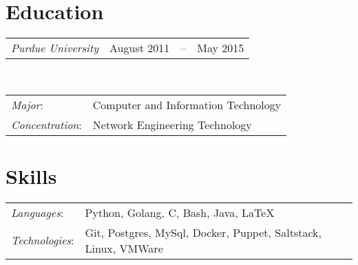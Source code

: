 \documentclass[line,margin]{res}
\begin{document}
  \name{\textcolor{TealBlue}{Ethan Madden}}
  \address{ethan@madden.ninja -- (812) 250-1419}%
  \address{2049 NW 60th St, Seattle WA 98107}

\begin{resume}
  \setlength\tabcolsep{2pt}
  \section{\textcolor{TealBlue}{Education}} 
    \begin{tabular}{@{} p{} r c l @{}}
      {\sl Purdue University\/} & August 2011 & -- & May 2015 %
    \end{tabular}\\
    \begin{tabular}{l l}
      {\sl Major\/}:& Computer and Information Technology \\
      {\sl Concentration\/}:& Network Engineering Technology
    \end{tabular}

  \section{\textcolor{TealBlue}{Skills}} 
    \begin{tabular}{l l}
      {\sl Languages\/}:& Python, Golang, C, Bash, Java, \LaTeX{} \\
      {\sl Technologies\/}:& Git, Postgres, MySql, Docker, Puppet, Saltstack, Linux, VMWare
    \end{tabular}


\end{resume}
\end{document}
